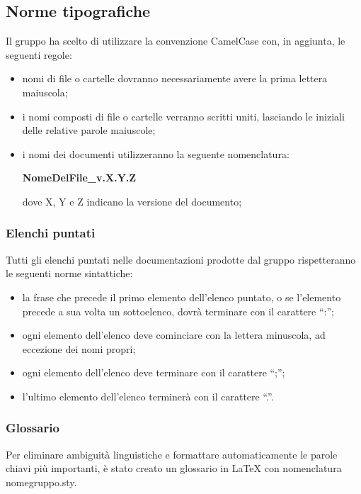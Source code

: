 \subsection{Norme tipografiche}
Il gruppo ha scelto di utilizzare la convenzione CamelCase con, in aggiunta, le seguenti regole:
\begin{itemize}
	\item nomi di file o cartelle dovranno necessariamente avere la prima lettera maiuscola;
	\item i nomi composti di file o cartelle verranno scritti uniti, lasciando le iniziali delle relative parole maiuscole;
	\item i nomi dei documenti utilizzeranno la seguente nomenclatura:
	\begin{center}
	\textbf{NomeDelFile\_v.X.Y.Z}
	\end{center}
	dove X, Y e Z indicano la versione del documento;
\end{itemize}

\subsubsection{Elenchi puntati}
Tutti gli elenchi puntati nelle documentazioni prodotte dal gruppo {\Gruppo} rispetteranno le seguenti norme sintattiche:
\begin{itemize}
	\item la frase che precede il primo elemento dell’elenco puntato, o se l’elemento precede a sua volta un sottoelenco, dovrà terminare con il carattere “:”;
	\item ogni elemento dell’elenco deve cominciare con la lettera minuscola, ad eccezione dei nomi propri;
	\item ogni elemento dell’elenco deve terminare con il carattere “;”;
	\item l’ultimo elemento dell’elenco terminerà con il carattere “.”.
\end{itemize}

\subsubsection{Glossario}
Per eliminare ambiguità linguistiche e formattare automaticamente le parole chiavi più importanti, è stato creato un glossario in \LaTeX{} con nomenclatura nomegruppo.sty.

